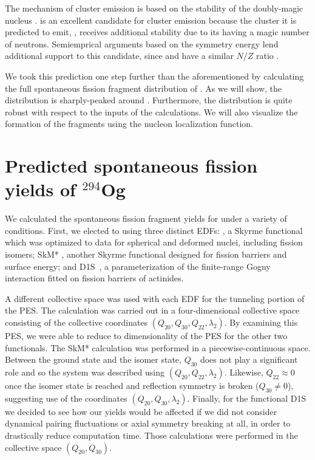 The mechanism of cluster emission is based on the stability of the doubly-magic nucleus {\Pb}. {\Og} is an excellent candidate for cluster emission because the cluster it is predicted to emit, {\Kr}, receives additional stability due to its having a magic number of neutrons.  Semiemprical arguments based on the symmetry energy lend additional support to this candidate, since {\Og} and {\Pb} have a similar $N/Z$ ratio \cite{Warda2018}.

We took this prediction one step further than the aforementioned by calculating the full spontaneous fission fragment distribution of {\Og}. As we will show, the distribution is sharply-peaked around {\Pb}. Furthermore, the distribution is quite robust with respect to the inputs of the calculations. We will also visualize the formation of the fragments using the nucleon localization function.

\section{Predicted spontaneous fission yields of $^{294}$Og}

We calculated the spontaneous fission fragment yields for {\Og} under a variety of conditions. First, we elected to  using three distinct EDFs: \hfb \cite{Schunck2015}, a Skyrme functional which was optimized to data for spherical and deformed nuclei, including fission isomers; SkM* \cite{Bartel1982}, another Skyrme functional designed for fission barriers and surface energy; and D1S~\cite{Berger1989}, a parameterization of the finite-range Gogny interaction fitted on fission barriers of actinides.

A different collective space was used with each EDF for the tunneling portion of the PES. The {\hfb} calculation was carried out in a four-dimensional collective space consisting of the collective coordinates $(Q_{20}, Q_{30}, Q_{22}, \lambda_2)$. By examining this PES, we were able to reduce to dimensionality of the PES for the other two functionals. The SkM* calculation was performed in a piecewise-continuous space. Between the ground state and the isomer state, $Q_{30}$ does not play a significant role and so the system was described using  $(Q_{20}, Q_{22}, \lambda_2)$. Likewise, $Q_{22} \approx 0$ once the isomer state is reached and reflection symmetry is broken ($Q_{30} \neq 0$), suggesting use of the coordinates  $(Q_{20}, Q_{30}, \lambda_2)$. Finally, for the functional D1S we decided to see how our yields would be affected if we did not consider dynamical pairing fluctuations or axial symmetry breaking at all, in order to drastically reduce computation time. Those calculations were performed in the collective space $(Q_{20}, Q_{30})$.

